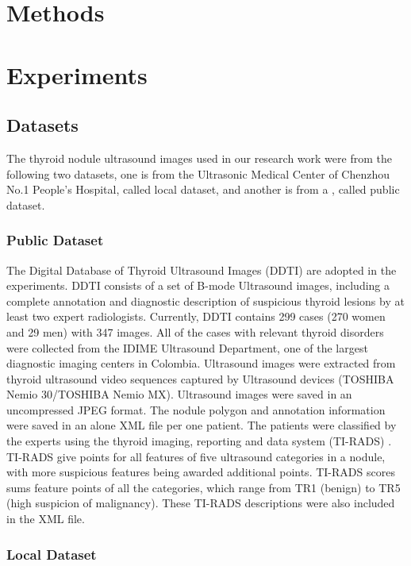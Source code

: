 \documentclass[journal]{IEEEtran}
\begin{document}
\section{Methods}

\section{Experiments}

\subsection{Datasets}

The thyroid nodule ultrasound images used in our research work were from the following two datasets, one is from the Ultrasonic Medical Center of Chenzhou No.1 People's Hospital, called local dataset, and another is from a , called public dataset.

\subsubsection{Public Dataset}

The Digital Database of Thyroid Ultrasound Images (DDTI) \cite{pedraza2015open} are adopted in the experiments. DDTI consists of a set of B-mode Ultrasound images, including a complete annotation and diagnostic description of suspicious thyroid lesions by at least two expert radiologists. Currently, DDTI contains 299 cases (270 women and 29 men) with 347 images. All of the cases with relevant thyroid disorders were collected from the IDIME Ultrasound Department, one of the largest diagnostic imaging centers in Colombia. Ultrasound images were extracted from thyroid ultrasound video sequences captured by Ultrasound devices (TOSHIBA Nemio 30/TOSHIBA Nemio MX). Ultrasound images were saved in an uncompressed JPEG format. The nodule polygon and annotation information were saved in an alone XML file per one patient. The patients were classified by the experts using the thyroid imaging, reporting and data system (TI-RADS) \cite{tessler2017acr}. TI-RADS give points for all features of five ultrasound categories in a nodule, with more suspicious features being awarded additional points. TI-RADS scores sums feature points of all the categories, which range from TR1 (benign) to TR5 (high suspicion of malignancy). These TI-RADS descriptions were also included in the XML file.

\subsubsection{Local Dataset}
\end{document}
